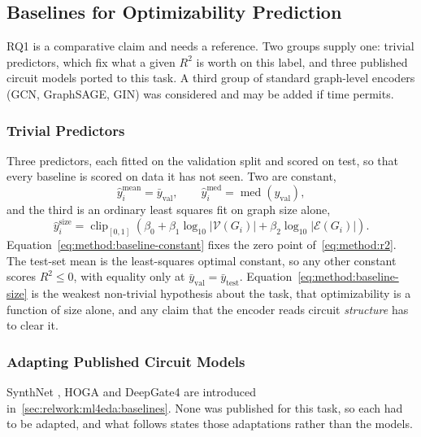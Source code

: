 \subsection{Baselines for Optimizability Prediction}
\label{sec:method:architecture:baselines}
RQ1 is a comparative claim and needs a reference. Two groups supply one: trivial predictors,
which fix what a given $R^2$ is worth on this label, and three published circuit models
ported to this task. A third group of standard graph-level encoders (GCN, GraphSAGE, GIN)
was considered and may be added if time permits.

\subsubsection{Trivial Predictors}
\label{sec:method:baselines:trivial}
Three predictors, each fitted on the validation split and scored on test, so that every
baseline is scored on data it has not seen. Two are constant,
\begin{equation}
    \hat{y}^{\text{mean}}_i = \bar{y}_{\text{val}},
    \qquad
    \hat{y}^{\text{med}}_i = \operatorname{med}\!\left( y_{\text{val}} \right),
    \label{eq:method:baseline-constant}
\end{equation}
and the third is an ordinary least squares fit on graph size alone,
\begin{equation}
    \hat{y}^{\text{size}}_i = \operatorname{clip}_{[0,1]}\!\left(
        \beta_0
        + \beta_1 \log_{10} \left| \mathcal{V}(G_i) \right|
        + \beta_2 \log_{10} \left| \mathcal{E}(G_i) \right| \right).
    \label{eq:method:baseline-size}
\end{equation}
Equation~\eqref{eq:method:baseline-constant} fixes the zero point
of~\eqref{eq:method:r2}. The test-set mean is the least-squares optimal constant, so any
other constant scores $R^2 \leq 0$, with equality only at
$\bar{y}_{\text{val}} = \bar{y}_{\text{test}}$. Equation~\eqref{eq:method:baseline-size} is
the weakest non-trivial hypothesis about the task, that optimizability is a function of size
alone, and any claim that the encoder reads circuit \emph{structure} has to clear it.

\subsubsection{Adapting Published Circuit Models}
\label{sec:method:baselines:published}
SynthNet \citep{chowdhury2021openabc}, HOGA \citep{deng2024hoga} and DeepGate4
\citep{deepgate4_2025} are introduced in~\ref{sec:relwork:ml4eda:baselines}. None was
published for this task, so each had to be adapted, and what follows states those
adaptations rather than the models.

